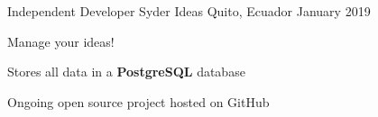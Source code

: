 
\begin{cventries}

  \cventry
    
  \cventry
    {Independent Developer}
    {Syder Ideas}
    {Quito, Ecuador}
    {January 2019}
    {
      \begin{cvitems}
        \item {Manage your ideas!}
        \item {Stores all data in a \textbf{PostgreSQL} database}
        \item {Ongoing open source project hosted on GitHub}
      \end{cvitems}
    }
        
\end{cventries}
